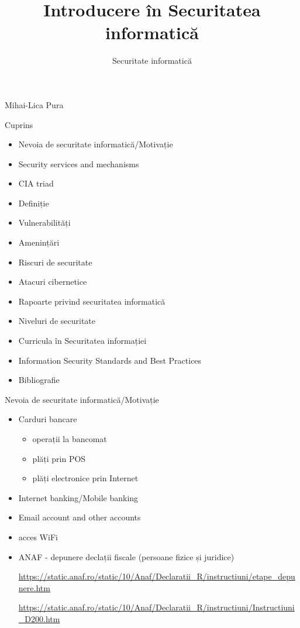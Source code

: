 \documentclass[pdf]{beamer}
\title{Introducere în Securitatea informatică}
\subtitle{Securitate informatică}
\begin{document}
\begin{frame}
	\titlepage
	
\begin{flushright}
Mihai-Lica Pura\\
\end{flushright}

\end{frame}



\begin{frame}{Cuprins}
\begin{itemize}
\item
Nevoia de securitate informatică/Motivație
\item
Security services and mechanisms
\item
CIA triad
\item
Definiție
\item
Vulnerabilități
\item
Amenințări
\item
Riscuri de securitate
\item
Atacuri cibernetice
\item
Rapoarte privind securitatea informatică
\item
Niveluri de securitate
\item
Curricula în Securitatea informației
\item
Information Security Standards and Best Practices
\item
Bibliografie
\end{itemize}
\end{frame}



\begin{frame}{Nevoia de securitate informatică/Motivație}
\begin{itemize}
\item
Carduri bancare
\begin{itemize}
\item
operații la bancomat
\item
plăți prin POS
\item
plăți electronice prin Internet
\end{itemize}
\item
Internet banking/Mobile banking
\item
Email account and other accounts
\item
acces WiFi
\item
ANAF - depunere declații fiscale (persoane fizice și juridice)

\url{https://static.anaf.ro/static/10/Anaf/Declaratii_R/instructiuni/etape_depunere.htm}

\url{https://static.anaf.ro/static/10/Anaf/Declaratii_R/instructiuni/Instructiuni_D200.htm}

\end{itemize}
\end{frame}
\end{document}
